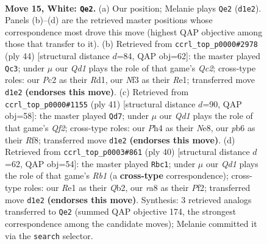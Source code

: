 \documentclass[11pt]{article}
\begin{document}
\clearpage

\begin{figure}[p]\centering
\begin{subfigure}{0.46\textwidth}\centering
\resizebox{\linewidth}{!}{%
\newchessgame
\chessboard[
  setfen={r1bqk2r/5p2/1p2pnp1/p1b4p/5B1P/1P1B1NP1/P1P2P2/R2QR1K1 w q - 4 15},
  showmover=false,
  pgfstyle=straightmove, color=movearrow, markmove={d1-e2}
]}
\caption{}
\end{subfigure}\hfill
\begin{subfigure}{0.46\textwidth}\centering
\resizebox{\linewidth}{!}{%
\newchessgame
\chessboard[
  setfen={3rnrk1/1pq2p1p/p1p3p1/2P2b2/1P2N2P/3B2P1/P1Q2P2/3RR1K1 w - - 3 23},
  showmover=false,
  pgfstyle=straightmove, color=movearrow, markmove={c2-c3}
]}
\caption{}
\end{subfigure}
\\[4pt]
\begin{subfigure}{0.46\textwidth}\centering
\resizebox{\linewidth}{!}{%
\newchessgame
\chessboard[
  setfen={2krnr2/2p2qpp/1p2bp2/p1p5/P3PR2/1P1PQ1N1/2P3PP/R1B3K1 b - - 3 21},
  showmover=false,
  pgfstyle=straightmove, color=movearrow, markmove={f7-d7}
]}
\caption{}
\end{subfigure}\hfill
\begin{subfigure}{0.46\textwidth}\centering
\resizebox{\linewidth}{!}{%
\newchessgame
\chessboard[
  setfen={r5k1/2r1qpp1/1p2bn1p/p1pp4/3P4/1PRBPN1P/PQ3PP1/1R4K1 w - - 10 21},
  showmover=false,
  pgfstyle=straightmove, color=movearrow, markmove={b1-c1}
]}
\caption{}
\end{subfigure}
\caption{\textbf{Move 15, White: \texttt{Qe2}.} (a) Our position; Melanie plays \texttt{Qe2} (\texttt{d1e2}). Panels (b)--(d) are the retrieved master positions whose correspondence most drove this move (highest QAP objective among those that transfer to it). (b) Retrieved from \texttt{ccrl\_top\_p0000\#2978} (ply 44) [structural distance $d$=84, QAP obj=62]: the master played \texttt{Qc3}; under $\mu$ our \emph{Qd1} plays the role of that game's \emph{Qc2}; cross-type roles: our \emph{P}c2 as their \emph{R}d1, our \emph{N}f3 as their \emph{R}e1; transferred move \texttt{d1e2} \textbf{(endorses this move)}. (c) Retrieved from \texttt{ccrl\_top\_p0000\#1155} (ply 41) [structural distance $d$=90, QAP obj=58]: the master played \texttt{Qd7}; under $\mu$ our \emph{Qd1} plays the role of that game's \emph{Qf2}; cross-type roles: our \emph{P}h4 as their \emph{N}e8, our \emph{p}b6 as their \emph{R}f8; transferred move \texttt{d1e2} \textbf{(endorses this move)}. (d) Retrieved from \texttt{ccrl\_top\_p0003\#861} (ply 40) [structural distance $d$=62, QAP obj=54]: the master played \texttt{Rbc1}; under $\mu$ our \emph{Qd1} plays the role of that game's \emph{Rb1} (a \textbf{cross-type} correspondence); cross-type roles: our \emph{R}e1 as their \emph{Q}b2, our \emph{r}a8 as their \emph{P}f2; transferred move \texttt{d1e2} \textbf{(endorses this move)}. Synthesis: 3 retrieved analogs transferred to \texttt{Qe2} (summed QAP objective 174, the strongest correspondence among the candidate moves); Melanie committed it via the \texttt{search} selector.}
\label{fig:thought-m28}
\end{figure}
\end{document}
